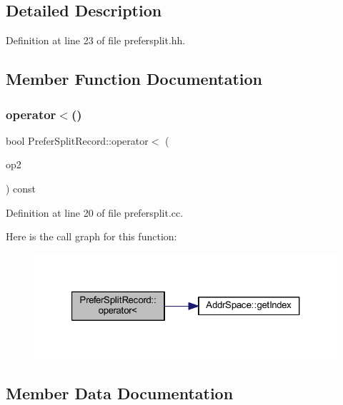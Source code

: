 \subsection{Detailed Description}


Definition at line 23 of file prefersplit.\+hh.



\subsection{Member Function Documentation}
\mbox{\label{struct_prefer_split_record_a1594db47a56d8287753cdcde658095d6}} 
\subsubsection{\texorpdfstring{operator$<$()}{operator<()}}
{\footnotesize\ttfamily bool Prefer\+Split\+Record\+::operator$<$ (\begin{DoxyParamCaption}\item[{const \mbox{\hyperlink{struct_prefer_split_record}{Prefer\+Split\+Record}} \&}]{op2 }\end{DoxyParamCaption}) const}



Definition at line 20 of file prefersplit.\+cc.

Here is the call graph for this function\+:
\nopagebreak
\begin{figure}[H]
\begin{center}
\leavevmode
\includegraphics[width=321pt]{struct_prefer_split_record_a1594db47a56d8287753cdcde658095d6_cgraph}
\end{center}
\end{figure}


\subsection{Member Data Documentation}
\mbox{\label{struct_prefer_split_record_aff669b928ff82ac2fd441343ccb4ecf3}} 
